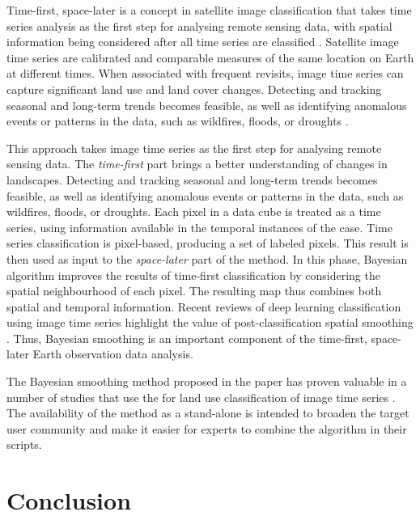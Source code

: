 \documentclass[
  shortnames]{jss}
\begin{document}
Time-first, space-later is a concept in satellite image classification that takes time series analysis as the first step for analysing remote sensing data, with spatial information being considered after all time series are classified \citep{Camara2016}. Satellite image time series are calibrated and comparable measures of the same location on Earth at different times. When associated with frequent revisits, image time series can capture significant land use and land cover changes. Detecting and tracking seasonal and long-term trends becomes feasible, as well as identifying anomalous events or patterns in the data, such as wildfires, floods, or droughts \citep{Woodcock2020}.

This approach takes image time series as the first step for analysing remote sensing data. The \textit{time-first} part brings a better understanding of changes in landscapes. Detecting and tracking seasonal and long-term trends becomes feasible, as well as identifying anomalous events or patterns in the data, such as wildfires, floods, or droughts. Each pixel in a data cube is treated as a time series, using information available in the temporal instances of the case. Time series classification is pixel-based, producing a set of labeled pixels. This result is then used as input to the \textit{space-later} part of the method. In this phase, Bayesian algorithm improves the results of time-first classification by considering the spatial neighbourhood of each pixel. The resulting map thus combines both spatial and temporal information. Recent reviews of deep learning classification using image time series highlight the value of post-classification spatial smoothing \citep{Perbet2024}. Thus, Bayesian smoothing is an important component of the time-first, space-later Earth observation data analysis.

The Bayesian smoothing method proposed in the paper has proven valuable in a number of studies that use the   for land use classification of image time series \citep{Picoli2018, Simoes2020, Hadi2023, Giuliani2024, Werner2024}. The availability of the method as a stand-alone  is intended to broaden the target user community and make it easier for  experts to combine the algorithm in their scripts.

\section{Conclusion}\label{conclusion}
\end{document}

